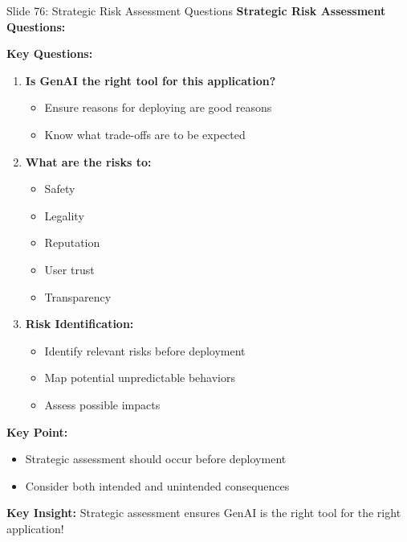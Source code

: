 \documentclass[8pt]{beamer}
\begin{document}
	\begin{frame}{Slide 76: Strategic Risk Assessment Questions}
		\fontsize{6.5}{7.5}\selectfont
		\textbf{Strategic Risk Assessment Questions:}
		
		\vspace{0.1cm}
		\textbf{Key Questions:}
		\begin{enumerate}
			\item \textbf{Is GenAI the right tool for this application?}
			\begin{itemize}
				\item Ensure reasons for deploying are good reasons
				\item Know what trade-offs are to be expected
			\end{itemize}
			\item \textbf{What are the risks to:}
			\begin{itemize}
				\item Safety
				\item Legality
				\item Reputation
				\item User trust
				\item Transparency
			\end{itemize}
			\item \textbf{Risk Identification:}
			\begin{itemize}
				\item Identify relevant risks before deployment
				\item Map potential unpredictable behaviors
				\item Assess possible impacts
			\end{itemize}
		\end{enumerate}
		
		\vspace{0.1cm}
		\textbf{Key Point:}
		\begin{itemize}
			\item Strategic assessment should occur before deployment
			\item Consider both intended and unintended consequences
		\end{itemize}
		
		\textcolor{myblue}{\textbf{Key Insight:}} Strategic assessment ensures \textcolor{myblue}{GenAI is the right tool for the right application}!
	\end{frame}
	
\end{document}
